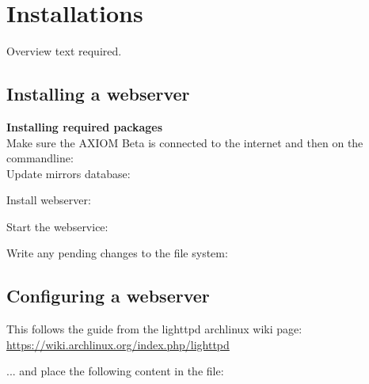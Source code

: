 \section{Installations}

Overview text required.





\subsection{Installing a webserver}

\textbf{Installing required packages}\\

Make sure the AXIOM Beta is connected to the internet and then on the commandline:\\

Update mirrors database: 


Install webserver: 


Start the webservice: 


Write any pending changes to the file system:






\subsection{Configuring a webserver}

This follows the guide from the lighttpd archlinux wiki page: \href{https://wiki.archlinux.org/index.php/lighttpd}{https://wiki.archlinux.org/index.php/lighttpd}

    
... and place the following content in the file: 


